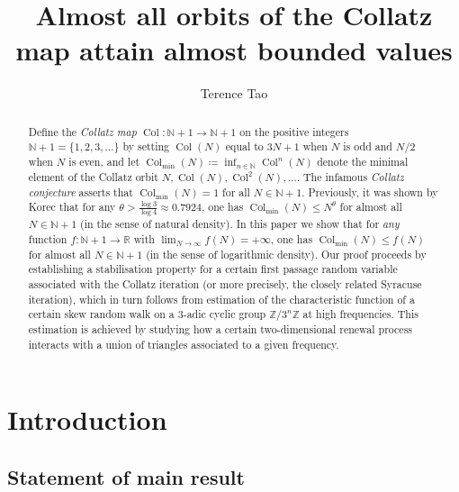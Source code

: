\documentclass[12pt,a4paper,reqno]{amsart}
\numberwithin{equation}{section}
\theoremstyle{plain}
\theoremstyle{definition}
\newcommand\R{\mathbb{R}}
\newcommand\Z{\mathbb{Z}}
\newcommand\N{\mathbb{N}}
\newcommand\Col{{\operatorname{Col}}}
\begin{document}
\title[Collatz orbits attain almost bounded values]{Almost all orbits of the Collatz map attain almost bounded values}

\author{Terence Tao}
\address{UCLA Department of Mathematics, Los Angeles, CA 90095-1555.}



\begin{abstract}  Define the \emph{Collatz map} $\Col \colon \N+1 \to \N+1$ on the positive integers $\N+1 = \{1,2,3,\dots\}$ by setting $\Col(N)$ equal to $3N+1$ when $N$ is odd and $N/2$ when $N$ is even, and let $\Col_{\min}(N) \coloneqq \inf_{n \in \N} \Col^n(N)$ denote the minimal element of the Collatz orbit $N, \Col(N), \Col^2(N), \dots$. The infamous \emph{Collatz conjecture} asserts that $\Col_{\min}(N)=1$ for all $N \in \N+1$.  Previously, it was shown by Korec that for any $\theta > \frac{\log 3}{\log 4} \approx 0.7924$, one has $\Col_{\min}(N) \leq N^\theta$ for almost all $N \in \N+1$ (in the sense of natural density).  In this paper we show that for \emph{any} function $f \colon \N+1 \to \R$ with $\lim_{N \to \infty} f(N)=+\infty$, one has $\Col_{\min}(N) \leq f(N)$ for almost all $N \in \N+1$ (in the sense of logarithmic density).  Our proof proceeds by establishing a stabilisation property for a certain first passage random variable associated with the Collatz iteration (or more precisely, the closely related Syracuse iteration), which in turn follows from estimation of the characteristic function of a certain skew random walk on a $3$-adic cyclic group $\Z/3^n\Z$ at high frequencies.  This estimation is achieved by studying how a certain two-dimensional renewal process interacts with a union of triangles associated to a given frequency.
\end{abstract}

\maketitle


\section{Introduction}

\subsection{Statement of main result}
\end{document}
